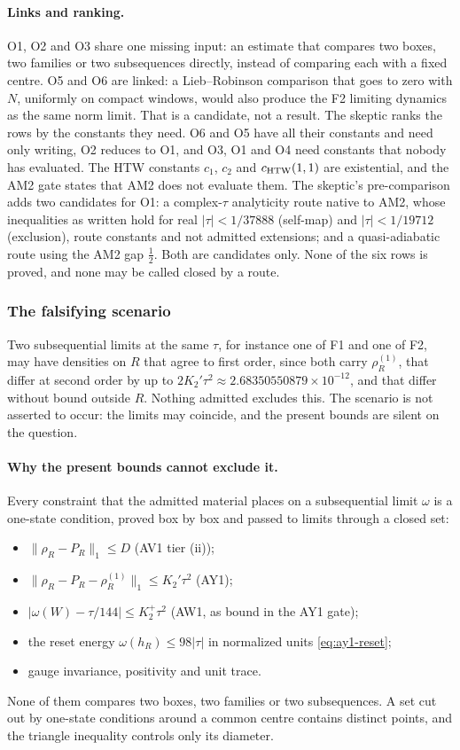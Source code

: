 \paragraph{Links and ranking.}
O1, O2 and O3 share one missing input: an estimate that compares two boxes,
two families or two subsequences directly, instead of comparing each with a
fixed centre. O5 and O6 are linked: a Lieb--Robinson comparison that goes to
zero with $N$, uniformly on compact windows, would also produce the F2
limiting dynamics as the same norm limit. That is a candidate, not a result.
The skeptic ranks the rows by the constants they need. O6 and O5 have all
their constants and need only writing, O2 reduces to O1, and O3, O1 and O4
need constants that nobody has evaluated. The HTW constants $c_1$, $c_2$ and
$c_{\rm HTW}(1,1)$ are existential, and the AM2 gate states that AM2 does not
evaluate them. The skeptic's pre-comparison adds two candidates for O1: a
complex-$\tau$ analyticity route native to AM2, whose inequalities as written
hold for real $|\tau|<1/37888$ (self-map) and $|\tau|<1/19712$ (exclusion),
route constants and not admitted extensions; and a quasi-adiabatic route
using the AM2 gap $\tfrac12$. Both are candidates only. None of the six rows
is proved, and none may be called closed by a route.

\subsubsection{The falsifying scenario}
\label{sec:ay2-falsifier}
Two subsequential limits at the same $\tau$, for instance one of F1 and one
of F2, may have densities on $R$ that agree to first order, since both carry
$\rho^{(1)}_R$, that differ at second order by up to
$2K_2'\tau^2\approx2.68350550879\times10^{-12}$, and that differ without
bound outside $R$. Nothing admitted excludes this. The scenario is not
asserted to occur: the limits may coincide, and the present bounds are silent
on the question.

\paragraph{Why the present bounds cannot exclude it.}
Every constraint that the admitted material places on a subsequential limit
$\omega$ is a one-state condition, proved box by box and passed to limits
through a closed set:
\begin{itemize}
\item $\lVert \rho_R-P_R\rVert_1\le D$ (AV1 tier (ii));
\item $\lVert \rho_R-P_R-\rho^{(1)}_R\rVert_1\le K_2'\tau^2$ (AY1);
\item $|\omega(W)-\tau/144|\le K_2^+\tau^2$ (AW1, as bound in the AY1 gate);
\item the reset energy $\omega(h_R)\le98|\tau|$ in normalized units
 \eqref{eq:ay1-reset};
\item gauge invariance, positivity and unit trace.
\end{itemize}
None of them compares two boxes, two families or two subsequences. A set cut
out by one-state conditions around a common centre contains distinct points,
and the triangle inequality controls only its diameter.

